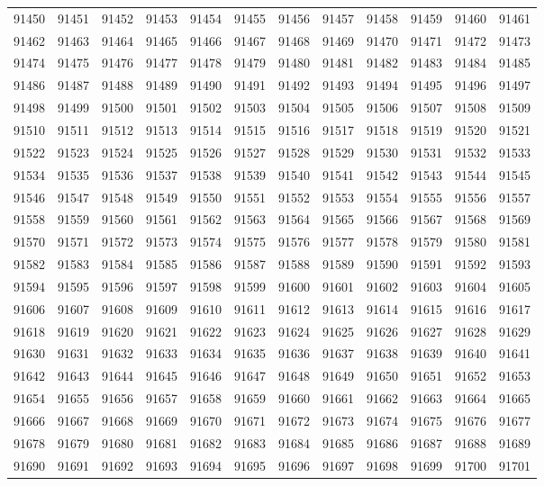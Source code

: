 \begin{center}
\begin{longtable}{llllllllllll}
91450 &91451 &91452 &91453 &91454 &91455 &91456 &91457 &91458 &91459 &91460 &91461 \\
91462 &91463 &91464 &91465 &91466 &91467 &91468 &91469 &91470 &91471 &91472 &91473 \\
91474 &91475 &91476 &91477 &91478 &91479 &91480 &91481 &91482 &91483 &91484 &91485 \\
91486 &91487 &91488 &91489 &91490 &91491 &91492 &91493 &91494 &91495 &91496 &91497 \\
91498 &91499 &91500 &91501 &91502 &91503 &91504 &91505 &91506 &91507 &91508 &91509 \\
91510 &91511 &91512 &91513 &91514 &91515 &91516 &91517 &91518 &91519 &91520 &91521 \\
91522 &91523 &91524 &91525 &91526 &91527 &91528 &91529 &91530 &91531 &91532 &91533 \\
91534 &91535 &91536 &91537 &91538 &91539 &91540 &91541 &91542 &91543 &91544 &91545 \\
91546 &91547 &91548 &91549 &91550 &91551 &91552 &91553 &91554 &91555 &91556 &91557 \\
91558 &91559 &91560 &91561 &91562 &91563 &91564 &91565 &91566 &91567 &91568 &91569 \\
91570 &91571 &91572 &91573 &91574 &91575 &91576 &91577 &91578 &91579 &91580 &91581 \\
91582 &91583 &91584 &91585 &91586 &91587 &91588 &91589 &91590 &91591 &91592 &91593 \\
91594 &91595 &91596 &91597 &91598 &91599 &91600 &91601 &91602 &91603 &91604 &91605 \\
91606 &91607 &91608 &91609 &91610 &91611 &91612 &91613 &91614 &91615 &91616 &91617 \\
91618 &91619 &91620 &91621 &91622 &91623 &91624 &91625 &91626 &91627 &91628 &91629 \\
91630 &91631 &91632 &91633 &91634 &91635 &91636 &91637 &91638 &91639 &91640 &91641 \\
91642 &91643 &91644 &91645 &91646 &91647 &91648 &91649 &91650 &91651 &91652 &91653 \\
91654 &91655 &91656 &91657 &91658 &91659 &91660 &91661 &91662 &91663 &91664 &91665 \\
91666 &91667 &91668 &91669 &91670 &91671 &91672 &91673 &91674 &91675 &91676 &91677 \\
91678 &91679 &91680 &91681 &91682 &91683 &91684 &91685 &91686 &91687 &91688 &91689 \\
91690 &91691 &91692 &91693 &91694 &91695 &91696 &91697 &91698 &91699 &91700 &91701 \\

\end{longtable}
\end{center}
